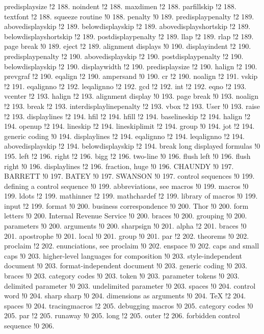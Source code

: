 predisplaysize !2 188.
noindent !2 188.
maxdimen !2 188.
parfillskip !2 188.
textfont !2 188.
squeeze routine !0 188.
penalty !0 189.
predisplaypenalty !2 189.
abovedisplayskip !2 189.
belowdisplayskip !2 189.
abovedisplayshortskip !2 189.
belowdisplayshortskip !2 189.
postdisplaypenalty !2 189.
llap !2 189.
rlap !2 189.
page break !0 189.
eject !2 189.
alignment displays !0 190.
displayindent !2 190.
predisplaypenalty !2 190.
abovedisplayskip !2 190.
postdisplaypenalty !2 190.
belowdisplayskip !2 190.
displaywidth !2 190.
predisplaysize !2 190.
halign !2 190.
prevgraf !2 190.
eqalign !2 190.
ampersand !0 190.
cr !2 190.
noalign !2 191.
vskip !2 191.
eqalignno !2 192.
leqalignno !2 192.
gcd !2 192.
int !2 192.
eqno !2 193.
vcenter !2 193.
halign !2 193.
alignment display !0 193.
page break !0 193.
noalign !2 193.
break !2 193.
interdisplaylinepenalty !2 193.
vbox !2 193.
User !0 193.
raise !2 193.
displaylines !2 194.
hfil !2 194.
hfill !2 194.
baselineskip !2 194.
halign !2 194.
openup !2 194.
lineskip !2 194.
lineskiplimit !2 194.
group !0 194.
jot !2 194.
generic coding !0 194.
displaylines !2 194.
eqalignno !2 194.
leqalignno !2 194.
abovedisplayskip !2 194.
belowdisplayskip !2 194.
break long displayed formulas !0 195.
left !2 196.
right !2 196.
bigg !2 196.
two-line !0 196.
flush left !0 196.
flush right !0 196.
displaylines !2 196.
fraction, huge !0 196.
CHAUNDY !0 197.
BARRETT !0 197.
BATEY !0 197.
SWANSON !0 197.
control sequences !0 199.
defining a control sequence !0 199.
abbreviations, see macros !0 199.
macros !0 199.
ldots !2 199.
mathinner !2 199.
mathchardef !2 199.
library of macros !0 199.
input !2 199.
format !0 200.
business correspondence !0 200.
Thor !0 200.
form letters !0 200.
Internal Revenue Service !0 200.
braces !0 200.
grouping !0 200.
parameters !0 200.
arguments !0 200.
sharpsign !0 201.
alpha !2 201.
braces !0 201.
apostrophe !0 201.
local !0 201.
group !0 201.
par !2 202.
theorems !0 202.
proclaim !2 202.
enunciations, see proclaim !0 202.
enspace !0 202.
caps and small caps !0 203.
higher-level languages for composition !0 203.
style-independent document !0 203.
format-independent document !0 203.
generic coding !0 203.
braces !0 203.
category codes !0 203.
token !0 203.
parameter tokens !0 203.
delimited parameter !0 203.
undelimited parameter !0 203.
spaces !0 204.
control word !0 204.
sharp sharp !0 204.
dimensions as arguments !0 204.
TeX !2 204.
spaces !0 204.
tracingmacros !2 205.
debugging macros !0 205.
category codes !0 205.
par !2 205.
runaway !0 205.
long !2 205.
outer !2 206.
forbidden control sequence !0 206.
